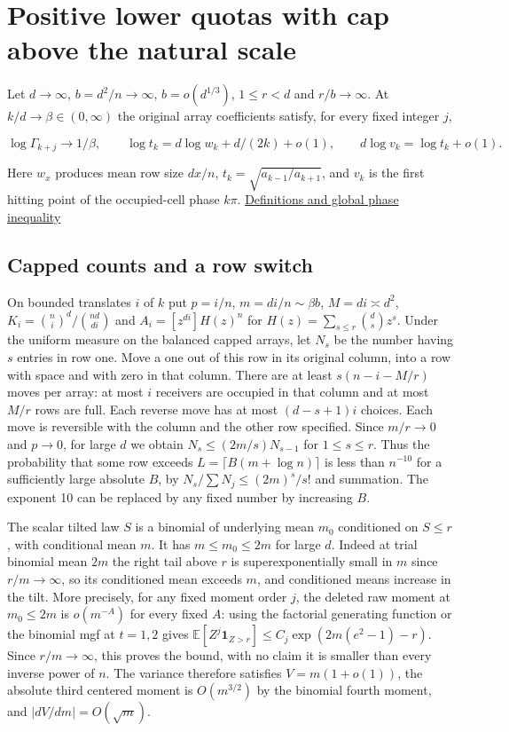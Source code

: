 \section{Positive lower quotas with cap above the natural scale}\label{sec:fifth-thirds-lower-quota}

Let $d\to\infty$, $b=d^2/n\to\infty$, $b=o(d^{1/3})$, $1\le r<d$ and $r/b\to\infty$. At $k/d\to\beta\in(0,\infty)$ the original array coefficients satisfy, for every fixed integer $j$,

\begin{equation*}
\log\Gamma_{k+j}\to1/\beta,\qquad
\log t_k=d\log w_k+d/(2k)+o(1),
\qquad d\log v_k=\log t_k+o(1).
\end{equation*}

Here $w_x$ produces mean row size $dx/n$, $t_k=\sqrt{a_{k-1}/a_{k+1}}$, and $v_k$ is the first hitting point of the occupied-cell phase $k\pi$. \href{https://github.com/ProgramComputer/open-math-research/blob/4fb624ba937a8eecc1361a6066185cd81ab7b172/topics/balanced-arrays/quadratic/proof.md}{Definitions and global phase inequality}

\subsection{Capped counts and a row switch}

On bounded translates $i$ of $k$ put $p=i/n$, $m=di/n\sim\beta b$, $M=di\asymp d^2$, $K_i=\binom ni^d/\binom{nd}{di}$ and $A_i=[z^{di}]H(z)^n$ for $H(z)=\sum_{s\le r}\binom ds z^s$. Under the uniform measure on the balanced capped arrays, let $N_s$ be the number having $s$ entries in row one. Move a one out of this row in its original column, into a row with space and with zero in that column. There are at least $s(n-i-M/r)$ moves per array: at most $i$ receivers are occupied in that column and at most $M/r$ rows are full. Each reverse move has at most $(d-s+1)i$ choices. Each move is reversible with the column and the other row specified. Since $m/r\to0$ and $p\to0$, for large $d$ we obtain $N_s\le (2m/s)N_{s-1}$ for $1\le s\le r$. Thus the probability that some row exceeds $L=\lceil B(m+\log n)\rceil$ is less than $n^{-10}$ for a sufficiently large absolute $B$, by $N_s/\sum N_j\le(2m)^s/s!$ and summation. The exponent 10 can be replaced by any fixed number by increasing $B$.

The scalar tilted law $S$ is a binomial of underlying mean $m_0$ conditioned on $S\le r$, with conditional mean $m$. It has $m\le m_0\le2m$ for large $d$. Indeed at trial binomial mean $2m$ the right tail above $r$ is superexponentially small in $m$ since $r/m\to\infty$, so its conditioned mean exceeds $m$, and conditioned means increase in the tilt. More precisely, for any fixed moment order $j$, the deleted raw moment at $m_0\le2m$ is $o(m^{-A})$ for every fixed $A$: using the factorial generating function or the binomial mgf at $t=1,2$ gives $\mathbb E[Z^j\mathbf1_{Z>r}]\le C_j\exp(2m(e^2-1)-r)$. Since $r/m\to\infty$, this proves the bound, with no claim it is smaller than every inverse power of $n$. The variance therefore satisfies $V=m(1+o(1))$, the absolute third centered moment is $O(m^{3/2})$ by the binomial fourth moment, and $|dV/dm|=O(\sqrt m)$.

